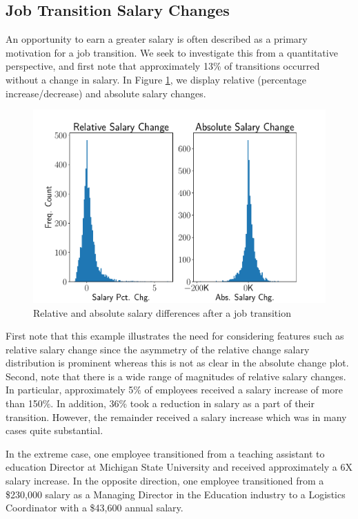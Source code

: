\documentclass[10pt]{article}
\begin{document}
\subsection{Job Transition Salary Changes}
An opportunity to earn a greater salary is often described as a primary motivation 
for a job transition.  We seek to investigate this from a quantitative perspective, 
and first note that approximately 
13\% of transitions occurred without a change in salary. 
In Figure \ref{fig:salgr}, we display relative (percentage increase/decrease) and  
absolute salary changes. 
%
\begin{figure}[thb]
    \centering
    \includegraphics[width=1.0\linewidth]{salgr.pdf}
	\caption{Relative and absolute salary differences after a job transition}
	\label{fig:salgr}
\end{figure}
%
First note that this example illustrates the need for considering 
features such as relative salary change since the asymmetry of the relative change salary distribution is 
prominent whereas this is not as clear in the absolute change plot.  
Second, note that there is a wide range of magnitudes of relative salary changes.  In particular, 
approximately 5\% of employees received a salary increase of more than 150\%.  In 
addition, 36\% took a reduction in salary as a part of their transition.  However, the remainder 
received a salary increase which was in many cases quite substantial. 

In the extreme case, one employee transitioned from a teaching assistant to 
education Director at Michigan State University and received approximately a 6X 
salary increase.  In the opposite direction, one employee transitioned from a \$230,000 
salary as a Managing Director in the Education industry to a Logistics Coordinator 
with a \$43,600 annual salary. 
\end{document}
